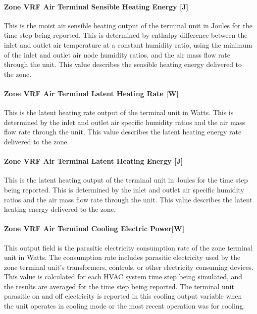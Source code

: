 \paragraph{Zone VRF Air Terminal Sensible Heating Energy {[}J{]}}\label{zone-vrf-air-terminal-sensible-heating-energy-j}

This is the moist air sensible heating output of the terminal unit in Joules for the time step being reported. This is determined by enthalpy difference between the inlet and outlet air temperature at a constant humidity ratio, using the minimum of the inlet and outlet air node humidity ratios, and the air mass flow rate through the unit. This value describes the sensible heating energy delivered to the zone.

\paragraph{Zone VRF Air Terminal Latent Heating Rate {[}W{]}}\label{zone-vrf-air-terminal-latent-heating-rate-w}

This is the latent heating rate output of the terminal unit in Watts. This is determined by the inlet and outlet air specific humidity ratios and the air mass flow rate through the unit. This value describes the latent heating energy rate delivered to the zone.

\paragraph{Zone VRF Air Terminal Latent Heating Energy {[}J{]}}\label{zone-vrf-air-terminal-latent-heating-energy-j}

This is the latent heating output of the terminal unit in Joules for the time step being reported. This is determined by the inlet and outlet air specific humidity ratios and the air mass flow rate through the unit. This value describes the latent heating energy delivered to the zone.

\paragraph{Zone VRF Air Terminal Cooling Electric Power{[}W{]}}\label{zone-vrf-air-terminal-cooling-electric-powerw}

This output field is the parasitic electricity consumption rate of the zone terminal unit in Watts. The consumption rate includes parasitic electricity used by the zone terminal unit's transformers, controls, or other electricity consuming devices. This value is calculated for each HVAC system time step being simulated, and the results are averaged for the time step being reported. The terminal unit parasitic on and off electricity is reported in this cooling output variable when the unit operates in cooling mode or the most recent operation was for cooling.

